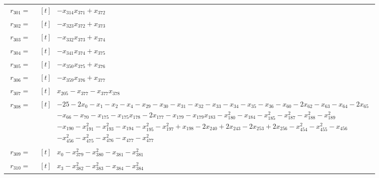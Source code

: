 \begin{longtable}{@{}r p{0.92\linewidth}@{}}
$r_{301}=$ & $\begin{aligned}[t]&-x_{314}x_{371}+x_{372}\end{aligned}$ \\[2pt]
$r_{302}=$ & $\begin{aligned}[t]&-x_{323}x_{372}+x_{373}\end{aligned}$ \\[2pt]
$r_{303}=$ & $\begin{aligned}[t]&-x_{332}x_{373}+x_{374}\end{aligned}$ \\[2pt]
$r_{304}=$ & $\begin{aligned}[t]&-x_{341}x_{374}+x_{375}\end{aligned}$ \\[2pt]
$r_{305}=$ & $\begin{aligned}[t]&-x_{350}x_{375}+x_{376}\end{aligned}$ \\[2pt]
$r_{306}=$ & $\begin{aligned}[t]&-x_{359}x_{376}+x_{377}\end{aligned}$ \\[2pt]
$r_{307}=$ & $\begin{aligned}[t]&x_{205}-x_{377}-x_{377}x_{378}\end{aligned}$ \\[2pt]
$r_{308}=$ & $\begin{aligned}[t]&-25-2x_{0}-x_{1}-x_{2}-x_{4}-x_{29}-x_{30}-x_{31}-x_{32}-x_{33}-x_{34}-x_{35}-x_{36}-x_{60}-2x_{62}-x_{63}-x_{64}-2x_{65}\\[-1pt] &-x_{66}-x_{70}-x_{175}-x_{175}x_{178}-2x_{177}-x_{179}-x_{179}x_{183}-x_{180}^{2}-x_{184}-x_{185}^{2}-x_{187}^{2}-x_{188}^{2}-x_{189}^{2}\\[-1pt] &-x_{190}-x_{191}^{2}-x_{193}^{2}-x_{194}-x_{195}^{2}-x_{197}^{2}+x_{198}-2x_{240}+2x_{243}-2x_{253}+2x_{256}-x_{454}^{2}-x_{455}^{2}-x_{456}\\[-1pt] &-x_{456}^{2}-x_{475}^{2}-x_{476}^{2}-x_{477}-x_{477}^{2}\end{aligned}$ \\[2pt]
$r_{309}=$ & $\begin{aligned}[t]&x_{0}-x_{379}^{2}-x_{380}^{2}-x_{381}-x_{381}^{2}\end{aligned}$ \\[2pt]
$r_{310}=$ & $\begin{aligned}[t]&x_{3}-x_{382}^{2}-x_{383}^{2}-x_{384}-x_{384}^{2}\end{aligned}$ \\[2pt]

\end{longtable}
